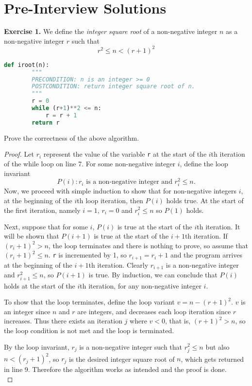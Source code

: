 \documentclass[11pt]{article}
\begin{document}
    \section*{Pre-Interview Solutions}
    \textbf{Exercise 1.} We define the \textit{integer square root} of a non-negative integer \(n\) as a non-negative integer \(r\) such that
    \[
        r^2 \leq n < (r + 1)^2
    \]
    \begin{lstlisting}[language=Python]
        def iroot(n):
        """
        PRECONDITION: n is an integer >= 0
        POSTCONDITION: return integer square root of n.
        """
        r = 0
        while (r+1)**2 <= n:
            r = r + 1
        return r
    \end{lstlisting}
    Prove the correctness of the above algorithm.

    \begin{proof}
        Let \(r_i\) represent the value of the variable \texttt{r} at the start of the \(i\)th iteration of the while loop on line 7. For some non-negative integer \(i\), define the loop invariant
        \[
            P(i): r_i \text{ is a non-negative integer and } r_i^2 \leq n.
        \]
        Now, we proceed with simple induction to show that for non-negative integers \(i\), at the beginning of the \(i\)th loop iteration, then \(P(i)\) holds true. At the start of the first iteration, namely \(i = 1\), \(r_i = 0\) and \(r_i^2 \leq n\) so \(P(1)\) holds.

        \medbreak

        \noindent Next, suppose that for some \(i\), \(P(i)\) is true at the start of the \(i\)th iteration. It will be shown that \(P(i + 1)\) is true at the start of the \(i + 1\)th iteration. If \((r_i + 1)^2 > n\), the loop terminates and there is nothing to prove, so assume that \((r_i + 1)^2 \leq n\). \texttt{r} is incremented by 1, so \(r_{i+1} = r_i + 1\) and the program arrives at the beginning of the \(i + 1\)th iteration. Clearly \(r_{i+1}\) is a non-negative integer and \(r_{i+1}^2 \leq n\), so \(P(i+1)\) is true. By induction, we can conclude that \(P(i)\) holds at the start of the \(i\)th iteration, for any non-negative integer \(i\).

        \medbreak

        \noindent To show that the loop terminates, define the loop variant \(v = n - (r + 1)^2\). \(v\) is an integer since \(n\) and \(r\) are integers, and decreases each loop iteration since \(r\) increases. Thus there exists an iteration \(j\) where \(v < 0\), that is, \((r + 1)^2 > n\), so the loop condition is not met and the loop is terminated.

        \medbreak

        \noindent By the loop invariant, \(r_j\) is a non-negative integer such that \(r_j^2 \leq n\) but also \(n < (r_j + 1)^2\), so \(r_j\) is the desired integer square root of \(n\), which gets returned in line 9. Therefore the algorithm works as intended and the proof is done. \\
    \end{proof}
\end{document}
